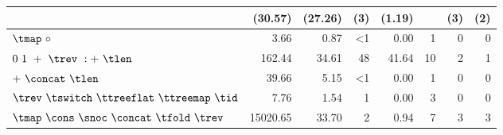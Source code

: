 \begin{tabular}{|l|r|r|rr|rrr|}
                                              &         (30.57)  &        (27.26)     &            (3)     &         (1.19)     &        &     (3) &      (2)  \\
\hline
$\tmap~\circ$                                 &          3.66  &         0.87     &           <1     &         0.00     &      1 &     0 &      0  \\
\hline
$0~1~+~\trev~:+~\tlen$                        &        162.44  &        34.61     &           48     &        41.64     &     10 &     2 &      1  \\
\hline
$+~\concat~\tlen$                             &         39.66  &         5.15     &           <1     &         0.00     &      1 &     0 &      0  \\
\hline
 $\trev~\tswitch~\ttreeflat~\ttreemap~\tid$    &          7.76  &         1.54     &            1     &         0.00     &      3 &     0 &      0  \\
\hline
$\tmap~\cons~\snoc~\concat~\tfold~\trev$      &      15020.65  &        33.70     &            2     &         0.94     &      7 &     3 &      3  \\
\hline
\end{tabular}
